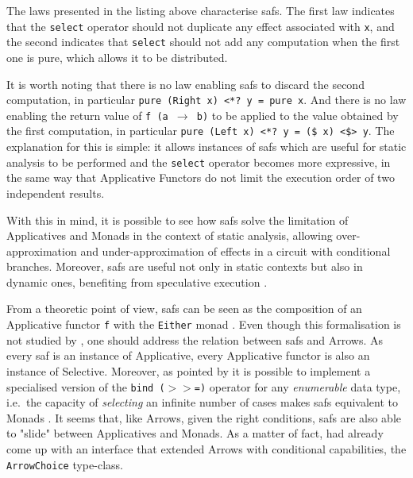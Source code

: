\documentclass[
  oneside,
  11pt, a4paper,
  footinclude=true,
  headinclude=true,
  cleardoublepage=empty
]{scrbook}
\theoremstyle{definition}
\theoremstyle{definition}
\begin{document}
	The laws presented in the listing above characterise \glspl{saf}. The first law indicates that the \texttt{select} operator should not duplicate any effect associated with \texttt{x}, and the second indicates that \texttt{select} should not add any computation when the first one is pure, which allows it to be distributed.
	            
	It is worth noting that there is no law enabling \glspl{saf} to discard the second computation, in particular \texttt{pure (Right x) <*? y = pure x}. And there is no law enabling the return value of \texttt{f (a $\rightarrow$ b)} to be applied to the value obtained by the first computation, in particular \texttt{pure (Left x) <*? y = (\$ x) <\$> y}. The explanation for this is simple: it allows instances of \glspl{saf} which are useful for static analysis to be performed and the \texttt{select} operator becomes more expressive, in the same way that Applicative Functors do not limit the execution order of two independent results.
	            
	With this in mind, it is possible to see how \glspl{saf} solve the limitation of Applicatives and Monads in the context of static analysis, allowing over-approximation and under-approximation of effects in a circuit with conditional branches. Moreover, \glspl{saf} are useful not only in static contexts but also in dynamic ones, benefiting from speculative execution \citep{andrey2019selective}.
	            
	From a theoretic point of view, \glspl{saf} can be seen as the composition of an Applicative functor \texttt{f} with the \texttt{Either} monad \citep{andrey2019selective}. Even though this formalisation is not studied by \cite{andrey2019selective}, one should address the relation between \glspl{saf} and Arrows.
	As every \gls{saf} is an instance of Applicative, every Applicative functor is also an instance of Selective. Moreover, as pointed by \cite{andrey2019selective} it is possible to implement a specialised version of the \texttt{bind ($>>$=)} operator for any \emph{enumerable} data type, i.e.\ the capacity of \emph{selecting} an infinite number of cases makes \glspl{saf} equivalent to Monads \citep{gist_2019}. It seems that, like Arrows, given the right conditions, \glspl{saf} are also able to "slide" between Applicatives and Monads. As a matter of fact, \cite{Hughes:2000:GMA:347238.347246} had already come up with an interface that extended Arrows with conditional capabilities, the \texttt{ArrowChoice} type-class.
	            
\end{document}
